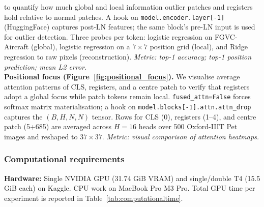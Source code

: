 to quantify how much global and local information outlier patches and registers hold relative to normal
patches. A hook on \texttt{model.encoder.layer[-1]} (HuggingFace) captures post-LN features; the same
block's pre-LN input is used for outlier detection. Three probes per token: logistic regression on
FGVC-Aircraft (global), logistic regression on a $7{\times}7$ position grid (local), and Ridge regression
to raw pixels (reconstruction). \textit{Metric: top-1 accuracy; top-1 position prediction; mean L2 error.}\\
\textbf{Positional focus (Figure~\ref{fig:positional_focus}).} We visualise average attention patterns of CLS,
registers, and a centre patch to verify that registers adopt a global focus while patch tokens remain local.
\texttt{fused\_attn=False} forces softmax matrix materialisation; a hook on
\texttt{model.blocks[-1].attn.attn\_drop} captures the $(B,H,N,N)$ tensor. Rows for CLS (0),
registers (1--4), and centre patch (5+685) are averaged across $H{=}16$ heads over 500 Oxford-IIIT Pet
images and reshaped to $37{\times}37$. \textit{Metric: visual comparison of attention heatmaps.}

\subsubsection{Computational requirements}
\textbf{Hardware:} Single NVIDIA GPU (31.74 GiB VRAM) and single/double T4 (15.5 GiB each) on Kaggle. CPU work on MacBook Pro M3 Pro.
Total GPU time per experiment is reported in Table~\ref{tab:computationaltime}.
